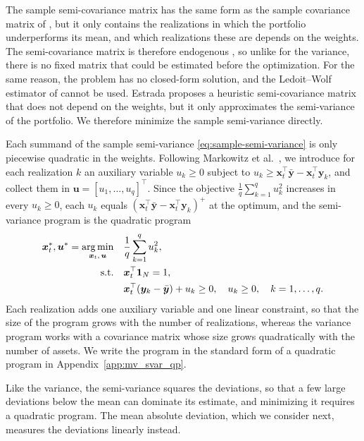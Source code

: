 The sample semi-covariance matrix has the same form as the sample covariance matrix of , but it
only contains the realizations in which the portfolio underperforms its mean, and which realizations these are depends
on the weights. The semi-covariance matrix is therefore endogenous \cite{Estrada2008}, so unlike for the variance,
there is no fixed matrix that could be estimated before the optimization. For the same reason, the problem has no
closed-form solution, and the Ledoit--Wolf estimator of  cannot be used. Estrada \cite{Estrada2008} proposes a heuristic semi-covariance
matrix that does not depend on the weights, but it only approximates the semi-variance of the portfolio. We therefore
minimize the sample semi-variance directly.

Each summand of the sample semi-variance \eqref{eq:sample-semi-variance} is only piecewise quadratic in the weights. Following Markowitz et al.~\cite{Markowitz1993}, we introduce for each realization $k$ an
auxiliary variable $u_k \ge 0$ subject to $u_k \ge \bm{x}_t^\top \bar{\bm{y}} - \bm{x}_t^\top \bm{y}_k$, and collect
them in $\bm{u} = [u_1, \dots, u_q]^\top$. Since the objective $\frac{1}{q} \sum_{k=1}^q u_k^2$ increases in every
$u_k \ge 0$, each $u_k$ equals $(\bm{x}_t^\top \bar{\bm{y}} - \bm{x}_t^\top \bm{y}_k)^+$ at the optimum, and the
semi-variance program is the quadratic program
\begin{equation*} 
\begin{aligned}
    \bm{x}_t^*, \bm{u}^* = \operatorname*{arg\,min}_{\bm{x}_t,\, \bm{u}} \quad & \frac{1}{q} \sum_{k=1}^q u_k^2, \\
    \text{s.t.} \quad & \bm{x}_t^\top \bm{1}_N = 1, \\
    & \bm{x}_t^\top (\bm{y}_k - \bar{\bm{y}}) + u_k \ge 0, \quad u_k \ge 0, \quad k = 1, \dots, q.
\end{aligned}
\end{equation*}
Each realization adds one auxiliary variable and one linear constraint, so that the size of the program grows with the
number of realizations, whereas the variance program works with a covariance matrix whose size grows quadratically with
the number of assets. We write the program in the standard form of a quadratic program in
Appendix~\ref{app:mv_svar_qp}.

Like the variance, the semi-variance squares the deviations, so that a few large deviations below the mean can dominate
its estimate, and minimizing it requires a quadratic program. The mean absolute deviation, which we consider next,
measures the deviations linearly instead.

